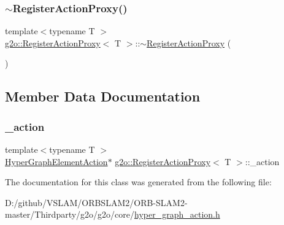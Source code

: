 \mbox{\label{classg2o_1_1_register_action_proxy_a73e8eacc965c3e9bb2084570c6b67eed}} 
\subsubsection{\texorpdfstring{$\sim$\+Register\+Action\+Proxy()}{~RegisterActionProxy()}}
{\footnotesize\ttfamily template$<$typename T $>$ \\
\mbox{\hyperlink{classg2o_1_1_register_action_proxy}{g2o\+::\+Register\+Action\+Proxy}}$<$ T $>$\+::$\sim$\mbox{\hyperlink{classg2o_1_1_register_action_proxy}{Register\+Action\+Proxy}} (\begin{DoxyParamCaption}{ }\end{DoxyParamCaption})\hspace{0.3cm}{\ttfamily [inline]}}



\subsection{Member Data Documentation}
\mbox{\label{classg2o_1_1_register_action_proxy_abab95a1b707467ceebfe1448e40202b8}} 
\subsubsection{\texorpdfstring{\+\_\+action}{\_action}}
{\footnotesize\ttfamily template$<$typename T $>$ \\
\mbox{\hyperlink{classg2o_1_1_hyper_graph_element_action}{Hyper\+Graph\+Element\+Action}}$\ast$ \mbox{\hyperlink{classg2o_1_1_register_action_proxy}{g2o\+::\+Register\+Action\+Proxy}}$<$ T $>$\+::\+\_\+action\hspace{0.3cm}{\ttfamily [private]}}



The documentation for this class was generated from the following file\+:\begin{DoxyCompactItemize}
\item 
D\+:/github/\+V\+S\+L\+A\+M/\+O\+R\+B\+S\+L\+A\+M2/\+O\+R\+B-\/\+S\+L\+A\+M2-\/master/\+Thirdparty/g2o/g2o/core/\mbox{\hyperlink{hyper__graph__action_8h}{hyper\+\_\+graph\+\_\+action.\+h}}\end{DoxyCompactItemize}

